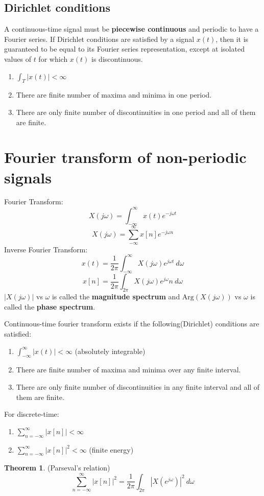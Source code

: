 \documentclass[10pt, a4paper]{extarticle}
\theoremstyle{definition}
\newtheorem*{thm}{Theorem}
\begin{document}
		\subsection{Dirichlet conditions}
		A continuous-time signal must be \textbf{piecewise continuous} and periodic to have a Fourier series. If Dirichlet conditions are satisfied by a signal $x(t)$, then it is guaranteed to be equal to its Fourier series representation, except at isolated values of $t$ for which $x(t)$ is discontinuous.
		\begin{enumerate}
			\item $\int_T |x(t)|<\infty$
			\item There are finite number of maxima and minima in one period.
			\item There are only finite number of discontinuities in one period and all of them are finite.
	\end{enumerate}

	\section{Fourier transform of non-periodic signals}
	Fourier Transform:
	\[X(j\omega)=\int_{-\infty}^{\infty}x(t)e^{-j\omega t}\]
	\[X(j\omega)=\sum_{-\infty}^{\infty}x[n]e^{-j\omega n}\]
	Inverse Fourier Transform:
	\[x(t)=\frac{1}{2\pi}\int_{-\infty}^{\infty}X(j\omega)e^{j\omega t}\ d\omega\]
	\[x[n]=\frac{1}{2\pi}\int_{2\pi}X(j\omega)e^{j\omega}n\ d\omega\]
$|X(j\omega)|$ vs $\omega$ is called the \textbf{magnitude spectrum} and $\text{Arg}(X(j\omega))$ vs $\omega$ is called the \textbf{phase spectrum}.
	
Continuous-time fourier transform exists if the following(Dirichlet) conditions are satisfied:
		\begin{enumerate}
			\item $\int_{-\infty}^{\infty} |x(t)|<\infty$ (absolutely integrable)
			\item There are finite number of maxima and minima over any finite interval.
			\item There are only finite number of discontinuities in any finite interval and all of them are finite.
	\end{enumerate}
	For discrete-time:
	\begin{enumerate}
		\item $\sum_{n=-\infty}^{\infty}|x[n]|<\infty$
		\item $\sum_{n=-\infty}^{\infty}|x[n]|^2<\infty$ (finite energy)
\end{enumerate}
\begin{thm}(Parseval's relation)
	\[\sum_{n=-\infty}^{\infty}|x[n]|^2=\frac{1}{2\pi}\int_{2\pi}|X(e^{j\omega})|^2\ d\omega\]
\end{thm}
	
\end{document}

